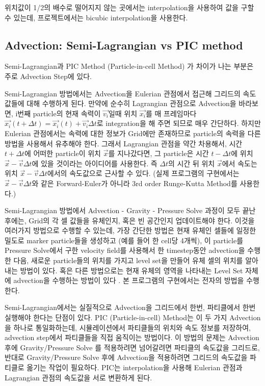 \documentclass[11pt, A4]{article}
\begin{document}
위치값이 1/2의 배수로 떨어지지 않는 곳에서는 interpolation을 사용하여 값을 구할 수 있는데, 프로젝트에서는 bicubic interpolation을 사용한다.

\subsection{Advection: Semi-Lagrangian vs PIC method}

Semi-Lagrangian과 PIC Method (Particle-in-cell Method) 가 차이가 나는 부분은 주로 Advection Step에 있다. 

Semi-Lagrangian 방법에서는 Advection을 Eulerian 관점에서 접근해 그리드의 속도 값들에 대해 수행하게 된다. 만약에 순수히 Lagrangian 관점으로 Advection을 바라보면, i번째 particle의 현재 속력이 $\vec{v_i}$일때 위치 $\vec{x_i}$를 매 프레임마다 $\vec{x_i}(t + \Delta t) = \vec{x_i}(t) + \vec{v_i} \Delta t$로 integration을 해 주면 되므로 매우 간단하다. 하지만 Eulerian 관점에서는 속력에 대한 정보가 Grid에만 존재하므로 particle의 속력을 다른 방법을 사용해서 유추해야 한다. 그래서 Lagrangian 관점을 약간 차용해서, 시간 $t + \Delta t$에 어떠한 particle이 위치 $\vec{x}$를 지나갔다면, 그 particle은 시간 $t - \Delta t$에 위치 $\vec{x} - \vec{v} \Delta t$에 있을 것이라는 아이디어를 사용한다. 즉 $\Delta t$의 시간 뒤 위치 $\vec{x}$에서 속도는 위치 $\vec{x} - \vec{v} \Delta t$에서의 속도값으로 근사할 수 있다. (실제 프로그램의 구현에서는 $\vec{x} - \vec{v} \Delta t$와 같은 Forward-Euler가 아니라 3rd order Runge-Kutta Method를 사용한다.) \cite[p.29-33]{fluid-sim-cg}

Semi-Lagrangian 방법에서 Advection - Gravity - Pressure Solve 과정이 모두 끝난 후에는, Grid의 각 셀 값들을 유체인지, 혹은 빈 공간인지 업데이트해야 한다. 이것을 여러가지 방법으로 수행할 수 있는데, 가장 간단한 방법은 현재 유체인 셀들에 일정한 밀도로 marker particle들을 생성하고 (예를 들어 한 cell당 4개씩), 이 particle를 Pressure Solve에서 구한 velocity field를 사용해서 한 timestep동안 advection을 수행한 다음, 새로운 particle들의 위치를 가지고 level set을 만들어 유체 셀의 위치를 알아내는 방법이 있다. 혹은 다른 방법으로는 현재 유체의 영역을 나타내는 Level Set 자체에 advection을 수행하는 방법이 있다 \cite[p.57]{fluid-sim-cg}. 본 프로그램의 구현에서는 전자의 방법을 수행한다.

Semi-Lagrangian에서는 실질적으로 Advection을 그리드에서 한번, 파티클에서 한번 실행해야 한다는 단점이 있다. PIC (Particle-in-cell) Method는 이 두 가지 Advection을 하나로 통일화하는데, 시뮬레이션에서 파티클들의 위치와 속도 정보를 저장하여, advection step에서 파티클들을 직접 움직이는 방법이다. 이 방법의 문제는 Advection 후에 Gravity/Pressure Solve 를 적용하려면 넘어갈려면 파티클의 속도값을 그리드로, 반대로 Gravity/Pressure Solve 후에 Advection을 적용하려면 그리드의 속도값을 파티클로 옮기는 작업이 필요하다. PIC는 interpolation을 사용해 Eulerian 관점과 Lagrangian 관점의 속도값을 서로 변환하게 된다. 
\end{document}
